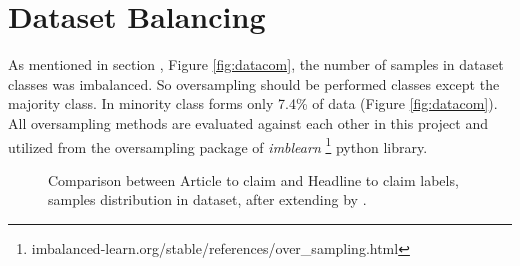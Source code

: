 \section{Dataset Balancing}
As mentioned in section , Figure \ref{fig:datacom}, the number of samples in dataset classes was imbalanced. So oversampling should be performed classes except the majority class.
In \cite{stance_persian} minority class forms only 7.4\% of data (Figure \ref{fig:datacom}).
 All oversampling methods are evaluated against each other in this project and utilized from the oversampling package of \textit{imblearn} \footnote{imbalanced-learn.org/stable/references/over\_sampling.html} python library. 

\begin{figure}%
	\centering
	\qquad
	\caption{Comparison between Article to claim and Headline to claim labels, samples distribution in \cite{stance_persian} dataset, after extending by \cite{parsfever} .}%
	\label{fig:datab1}%
\end{figure}



